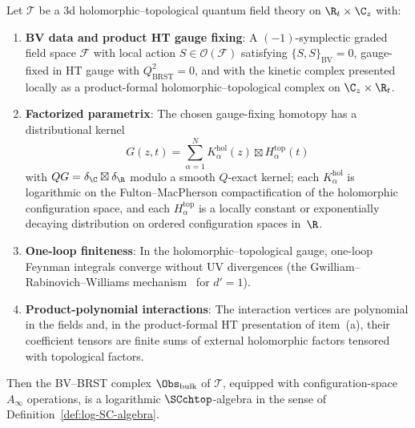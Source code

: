 \begin{theorem}
\label{thm:physics-bridge}
Let $\mathcal{T}$ be a 3d holomorphic--topological quantum field theory on $\R_t \times \C_z$ with:
\begin{enumerate}[label=(\alph*)]
\item \textbf{BV data and product HT gauge fixing}: A
$(-1)$-symplectic graded field space $\mathcal{F}$ with local action
$S \in \mathcal{O}(\mathcal{F})$ satisfying
$\{S,S\}_{\mathrm{BV}} = 0$, gauge-fixed in HT gauge with
$Q_{\mathrm{BRST}}^2 = 0$, and with the kinetic complex presented
locally as a product-formal holomorphic--topological complex on
$\C_z\times\R_t$.

\item \textbf{Factorized parametrix}: The chosen gauge-fixing
homotopy has a distributional kernel
\[
 G(z,t)=\sum_{\alpha=1}^{N} K_\alpha^{\mathrm{hol}}(z)
 \boxtimes H_\alpha^{\mathrm{top}}(t)
\]
with $QG=\delta_{\C}\boxtimes\delta_{\R}$ modulo a smooth
$Q$-exact kernel; each $K_\alpha^{\mathrm{hol}}$ is logarithmic on
the Fulton--MacPherson compactification of the holomorphic
configuration space, and each $H_\alpha^{\mathrm{top}}$ is a locally
constant or exponentially decaying distribution on ordered
configuration spaces in~$\R$.

\item \textbf{One-loop finiteness}: In the holomorphic--topological
gauge, one-loop Feynman integrals converge without UV divergences
(the Gwilliam--Rabinovich--Williams mechanism~\cite{GRW21} for
$d' = 1$).

\item \textbf{Product-polynomial interactions}: The interaction
vertices are polynomial in the fields and, in the product-formal HT
presentation of item~\textup{(a)}, their coefficient tensors are
finite sums of external holomorphic factors tensored with
topological factors.
\end{enumerate}
Then the BV--BRST complex $\Obs_{\mathrm{bulk}}$ of $\mathcal{T}$, equipped with configuration-space $A_\infty$ operations, is a logarithmic $\SCchtop$-algebra in the sense of Definition~\ref{def:log-SC-algebra}.
\end{theorem}

